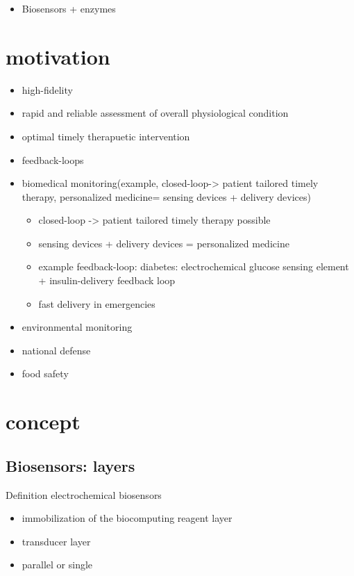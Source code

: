 \documentclass[runningheads]{llncs}
\begin{document}
	\begin{itemize}
		\item Biosensors + enzymes
	\end{itemize}


\section{motivation}
\begin{itemize}
	\item high-fidelity
	\item rapid and reliable assessment of overall physiological condition
	\item optimal timely therapuetic intervention
	\item feedback-loops
		\item biomedical monitoring(example, closed-loop-> patient tailored timely therapy, personalized medicine= sensing devices + delivery devices)
		\begin{itemize}
			\item closed-loop -> patient tailored timely therapy possible
			\item sensing devices + delivery devices = personalized medicine
			\item example feedback-loop: diabetes: electrochemical glucose sensing element + insulin-delivery feedback loop
			\item fast delivery in emergencies 
		\end{itemize}
		\item environmental monitoring
		\item national defense
		\item food safety
		\\
		
	
\end{itemize}


\section{concept}
\subsection{Biosensors: layers}
	Definition electrochemical biosensors
	\begin{itemize}
		\item immobilization of the biocomputing reagent layer
		\item transducer layer
		\item parallel or single
		
		
	\end{itemize}
\end{document}
